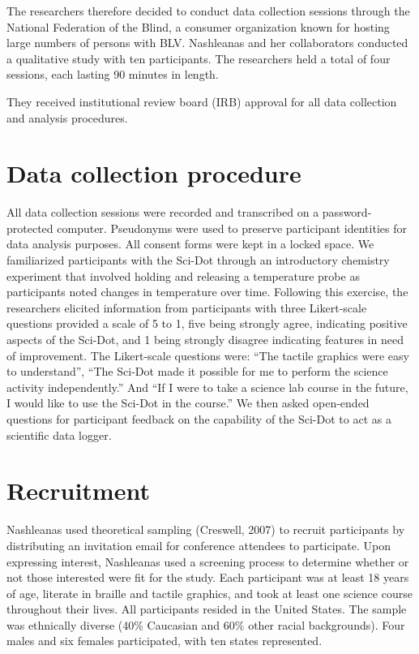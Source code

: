\documentclass[11.5pt]{sig-alternate}
\begin{document}
\begin{large}
The researchers therefore decided to conduct data collection sessions through the National Federation of the Blind, a consumer organization known for hosting large numbers of persons with BLV. Nashleanas and her collaborators conducted a qualitative study with ten participants. The researchers held a total of four sessions, each lasting 90 minutes in length.

They received institutional review board (IRB) approval for all data collection and analysis procedures. 

\section*{Data collection procedure}

All data collection sessions were recorded and transcribed on a password-protected computer. Pseudonyms were used to preserve participant identities for data analysis purposes. All consent forms were kept in a locked space. We familiarized participants with the Sci-Dot through an introductory chemistry experiment that involved holding and releasing a temperature probe as participants noted changes in temperature over time. Following this exercise, the researchers elicited information from participants with three Likert-scale questions provided a scale of 5 to 1, five being strongly agree, indicating positive aspects of the Sci-Dot, and 1 being strongly disagree indicating features in need of improvement. The Likert-scale questions were: “The tactile graphics were easy to understand”, “The Sci-Dot made it possible for me to perform the science activity independently.” And “If I were to take a science lab course in the future, I would like to use the Sci-Dot in the course.” We then asked open-ended questions for participant feedback on the capability of the Sci-Dot to act as a scientific data logger.

\section*{Recruitment}
Nashleanas used theoretical sampling (Creswell, 2007) to recruit participants by distributing an invitation email for conference attendees to participate. Upon expressing interest, Nashleanas used a screening process to determine whether or not those interested were fit for the study. Each participant was at least 18 years of age, literate in braille and tactile graphics, and took at least one science course throughout their lives. All participants resided in the United States. The sample was ethnically diverse (40\% Caucasian and 60\% other racial backgrounds). Four males and six females participated, with ten states represented. 


\end{large}
\end{document}
